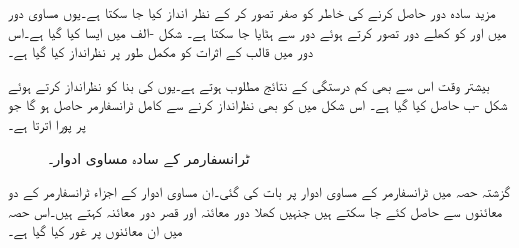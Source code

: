 مزید سادہ دور حاصل کرنے کی خاطر  کو صفر تصور کر کے  نظر انداز کیا جا  سکتا ہے۔یوں مساوی دور میں  اور  کو کھلے دور تصور کرتے ہوئے  دور سے  ہٹایا جا سکتا ہے۔ شکل -الف  میں ایسا کیا گیا ہے۔اس دور میں قالب کے اثرات کو مکمل طور پر نظرانداز کیا گیا ہے۔

بیشتر وقت  اس سے بھی کم درستگی کے نتائج مطلوب ہوتے ہے۔یوں  کی بنا   کو  نظرانداز کرتے ہوئے  شکل -ب حاصل کیا گیا ہے۔ اس شکل میں  کو بھی نظرانداز کرنے سے کامل ٹرانسفارمر حاصل ہو گا جو   پر پورا اترتا ہے۔


\begin{figure}
\centering
\caption{ٹرانسفارمر کے سادہ مساوی ادوار۔}
\label{شکل_ٹرانسفارمر_سادہ_ماڈل}
\end{figure}
گزشتہ حصہ میں  ٹرانسفارمر کے مساوی ادوار پر بات کی گئی۔ان مساوی ادوار  کے اجزاء ٹرانسفارمر کے دو معائنوں سے حاصل کئے جا سکتے ہیں جنہیں  کھلا دور معائنہ اور قصر دور معائنہ کہتے ہیں۔اس حصہ میں ان معائنوں پر غور کیا گیا ہے۔

